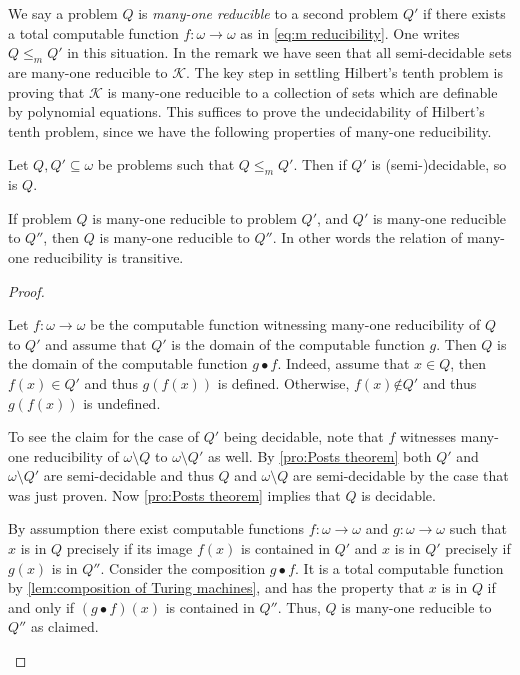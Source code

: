 We say a problem \(Q\) is \emph{many-one reducible} to a second problem \(Q'\)
if there exists a total computable function \(f: ω → ω\) as in \eqref{eq:m
reducibility}. One writes \(Q ≤_m Q'\) in this situation. In the remark we have
seen that all semi-decidable sets are many-one reducible to \(\mathcal{K}\). The
key step in settling Hilbert's tenth problem is proving that \(\mathcal{K}\) is
many-one reducible to a collection of sets which are definable by polynomial
equations. This suffices to prove the undecidability of Hilbert's tenth problem,
since we have the following properties of many-one reducibility.

\begin{pro}\label{pro:m reducibility and decidability}
  \begin{thmlist}
    \item Let \(Q, Q' \subseteq ω\) be problems such that \(Q ≤_m Q'\). Then if
    \(Q'\) is \hbox{(semi-)}decidable, so is \(Q\).

    \item If problem \(Q\) is many-one reducible to problem \(Q'\), and \(Q'\)
    is many-one reducible to \(Q''\), then \(Q\) is many-one reducible to
    \(Q''\). In other words the relation of many-one reducibility is transitive.
  \end{thmlist}
\end{pro}
\begin{proof}
  \begin{plist}
    \item   Let \(f: ω → ω\) be the computable function witnessing many-one
    reducibility of \(Q\) to \(Q'\) and assume that \(Q'\) is the domain of the
    computable function \(g\). Then \(Q\) is the domain of the computable
    function \(g • f\). Indeed, assume that \(x ∈ Q\), then \(f(x) ∈ Q'\) and
    thus \(g(f(x))\) is defined. Otherwise, \(f(x) \not∈ Q'\) and thus
    \(g(f(x))\) is undefined.

    To see the claim for the case of \(Q'\) being decidable, note that \(f\)
    witnesses many-one reducibility of \(ω \setminus Q\) to \(ω \setminus Q'\)
    as well. By \cref{pro:Posts theorem} both \(Q'\) and \(ω \setminus Q'\) are
    semi-decidable and thus \(Q\) and \(ω \setminus Q\) are semi-decidable by
    the case that was just proven. Now \cref{pro:Posts theorem} implies that
    \(Q\) is decidable.

    \item By assumption there exist computable functions \(f: ω → ω\) and \(g:
    ω → ω\) such that \(x\) is in \(Q\) precisely if its image \(f(x)\) is
    contained in \(Q'\) and \(x\) is in \(Q'\) precisely if \(g(x)\) is in
    \(Q''\). Consider the composition \(g • f\). It is a total computable
    function by \cref{lem:composition of Turing machines}, and has the property
    that \(x\) is in \(Q\) if and only if \((g • f)(x)\) is contained in
    \(Q''\). Thus, \(Q\) is many-one reducible to \(Q''\) as claimed.
  \end{plist}
\end{proof}
